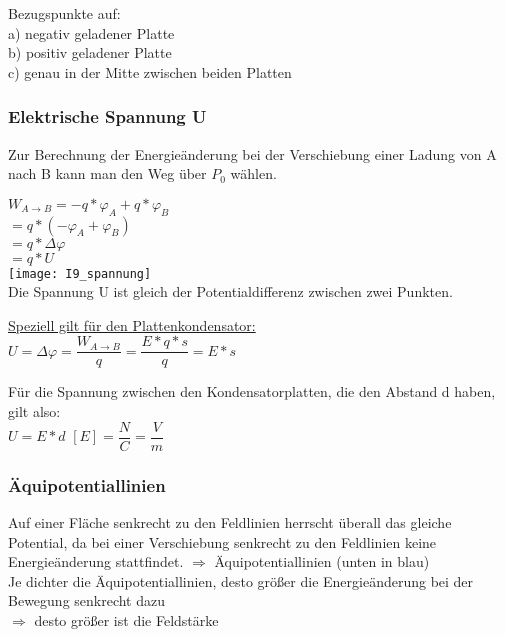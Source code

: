 \documentclass[12pt]{scrartcl}
\begin{document}
\begin{flushleft}
			\vspace{2mm}
			Bezugspunkte auf: \\
			a) negativ geladener Platte \\
			b) positiv geladener Platte \\
			c) genau in der Mitte zwischen beiden Platten \\
			
			\newpage
			
			\subsubsection{Elektrische Spannung U}
			Zur Berechnung der Energieänderung bei der Verschiebung einer Ladung von A nach B kann man den Weg über $P_{0}$ wählen. 
			
			\vspace{2mm}
			$ W_{A \rightarrow B} = -q \ast \varphi_{A} + q \ast \varphi_{B} $ \\
			\hspace{11.5mm} $ = q \ast (- \varphi_{A} + \varphi_{B}) $ \\
			\hspace{11.5mm} $ = q \ast \Delta \varphi $ \\
			\hspace{11.5mm} $ = q \ast U  $ 
			\vspace{2mm} \\
			\texttt{[image: I9\_spannung]}
			\vspace{2mm} \\
			Die Spannung U ist gleich der Potentialdifferenz zwischen zwei Punkten.
			
			\vspace{5mm}
			\underline{Speziell gilt für den Plattenkondensator:} \\
			\vspace{2mm}
			$ U = \Delta  \varphi = \dfrac{W_{A \rightarrow B}}{q} = \dfrac{E \ast q \ast s}{q} = E \ast s $
			
			\vspace{2mm}
			Für die Spannung zwischen den Kondensatorplatten, die den Abstand d haben, gilt also: \\
			\vspace{2mm}
			$ U = E \ast d $ \hspace{10mm} $ [E] = \dfrac{N}{C} = \dfrac{V}{m} $
			\newpage
			\subsubsection{Äquipotentiallinien}
			Auf einer Fläche senkrecht zu den Feldlinien herrscht überall das gleiche Potential, da bei einer Verschiebung senkrecht zu den Feldlinien keine Energieänderung stattfindet. $\Rightarrow$ Äquipotentiallinien (unten in blau) \\
			\vspace{3mm}
			Je dichter die Äquipotentiallinien, desto größer die Energieänderung bei der Bewegung senkrecht dazu \\ $\Rightarrow$ desto größer ist die Feldstärke
			\vspace{2mm}
			

\end{flushleft}
\end{document}
